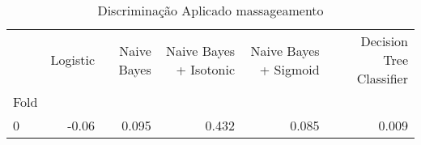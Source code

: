 \begin{table}
\centering
\caption{Discriminação Aplicado massageamento}
\label{Discriminação Aplicado massageamento 7}
\begin{tabular}{lrrrrr}
\toprule
{} &  Logistic &  Naive Bayes &  Naive Bayes + Isotonic &  Naive Bayes + Sigmoid &  Decision Tree Classifier \\
Fold &           &              &                         &                        &                           \\
\midrule
0    &     -0.06 &        0.095 &                   0.432 &                  0.085 &                     0.009 \\
\bottomrule
\end{tabular}
\end{table}
